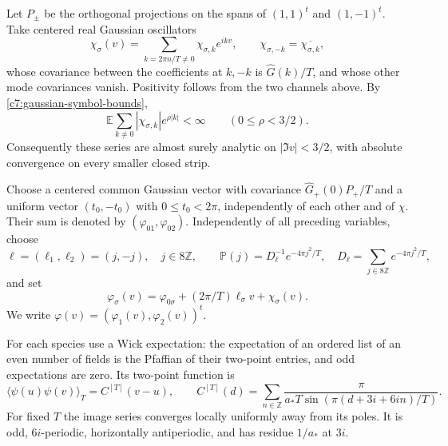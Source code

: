 Let $P_\pm$ be the orthogonal projections on the spans of $(1,1)^t$ and $(1,-1)^t$. Take centered real Gaussian oscillators
\[
\chi_\sigma(v)=\sum_{k=2\pi n/T\ne0}\chi_{\sigma,k}e^{ikv},
\qquad \chi_{\sigma,-k}=\overline{\chi_{\sigma,k}},
\]
whose covariance between the coefficients at $k,-k$ is $\widehat G(k)/T$, and whose other mode covariances vanish. Positivity follows from the two channels above. By \eqref{c7:gaussian-symbol-bounds},
\[
\mathbb E\sum_{k\ne0}|\chi_{\sigma,k}|e^{\rho|k|}<\infty
\qquad(0\le\rho<3/2).
\]
Consequently these series are almost surely analytic on $|\Im v|<3/2$, with absolute convergence on every smaller closed strip.

Choose a centered common Gaussian vector with covariance $\widehat G_+(0)P_+/T$ and a uniform vector $(t_0,-t_0)$ with $0\le t_0<2\pi$, independently of each other and of $\chi$. Their sum is denoted by $(\varphi_{01},\varphi_{02})$. Independently of all preceding variables, choose
\[
\boldsymbol\ell=(\ell_1,\ell_2)=(j,-j),\quad j\in8\mathbb Z,\qquad
\mathbb P(j)=D_\ell^{-1}e^{-4\pi j^2/T},\quad
D_\ell=\sum_{j\in8\mathbb Z}e^{-4\pi j^2/T},
\]
and set
\[
\varphi_\sigma(v)=\varphi_{0\sigma}+(2\pi/T)\ell_\sigma v+\chi_\sigma(v).
\]
We write $\varphi(v)=(\varphi_1(v),\varphi_2(v))^t$.

For each species use a Wick expectation: the expectation of an ordered list of an even number of fields is the Pfaffian of their two-point entries, and odd expectations are zero. Its two-point function is
\[
\langle\psi(u)\psi(v)\rangle_T=C^{[T]}(v-u),\qquad
C^{[T]}(d)=\sum_{n\in\mathbb Z}
 \frac{\pi}{a_*T\sin(\pi(d+3i+6in)/T)}.
\]
For fixed $T$ the image series converges locally uniformly away from its poles. It is odd, $6i$-periodic, horizontally antiperiodic, and has residue $1/a_*$ at $3i$.

